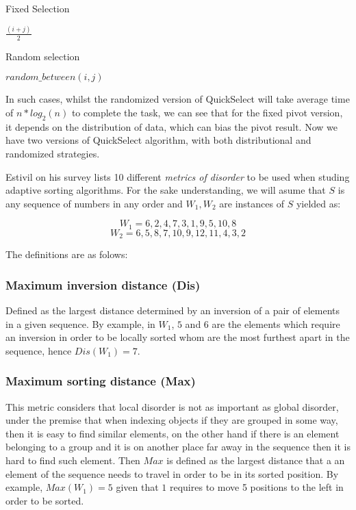 \begin{algorithm}
  \caption{Fixed Selection}\label{ALG:Select_fixed}
  \begin{algorithmic}[1]
    \State \Return $\frac{(i+j)}{2}$
    \EndProcedure
  \end{algorithmic}
\end{algorithm}

\begin{algorithm}
  \caption{Random selection}\label{ALG:Select_random}
  \begin{algorithmic}[1]
    \State \Return $random\_between(i,j)$
    \EndProcedure
  \end{algorithmic}
\end{algorithm}

In such cases, whilst the randomized version of QuickSelect will take average time of $n*log_2(n)$ to complete the task, we can see that for the fixed pivot version, it depends on the distribution of data, which can bias the pivot result. Now we have two versions of QuickSelect algorithm, with both distributional and randomized strategies.

Estivil \cite{estivil92} on his survey lists 10 different \textit{metrics of disorder} to be used when studing adaptive sorting algorithms. For the sake understanding, we will asume that $S$ is any sequence of numbers in any order and $W_1,W_2$ are instances of $S$ yielded as: 

$$W_1 = {6,2,4,7,3,1,9,5,10,8}$$
$$W_2 = {6,5,8,7,10,9,12,11,4,3,2}$$

The definitions are as folows:

\subsubsection{Maximum inversion distance (Dis)}
Defined as the largest distance determined by an inversion of a pair of elements in a given sequence\cite{Estivill-Castro_Wood_1989}.  By example, in $W_1$,  $5$ and $6$ are the elements which require an inversion in order to be locally sorted whom are the most furthest apart in the sequence, hence $Dis(W_1) = 7$.

\subsubsection{Maximum sorting distance (Max)}
This metric considers that local disorder is not as important as global disorder, under the premise that when indexing objects if they are grouped in some way, then it is easy to find similar elements, on the other hand if there is an element belonging to a group and it is on another place far away in the sequence then it is hard to find such element. Then $Max$ is defined as the largest distance that a an element of the sequence needs to travel in order to be in its sorted position\cite{Estivill-Castro_Wood_1989}. By example, $Max(W_1) = 5$ given that $1$ requires to move 5 positions to the left in order to be sorted.

